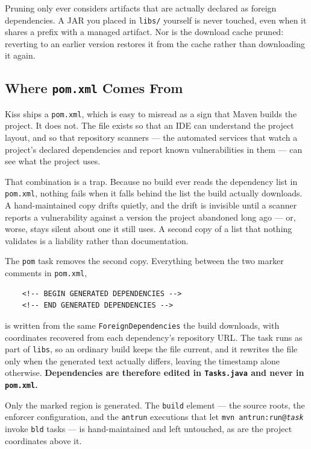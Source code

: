 \begin{notebox}
Pruning only ever considers artifacts that are actually declared as foreign dependencies.  A JAR you placed in \texttt{libs/} yourself is never touched, even when it shares a prefix with a managed artifact.  Nor is the download cache pruned: reverting to an earlier version restores it from the cache rather than downloading it again.
\end{notebox}

\subsection{Where \texttt{pom.xml} Comes From}
\label{sec:build-pom}

Kiss ships a \texttt{pom.xml}, which is easy to misread as a sign that Maven builds the project.  It does not.  The file exists so that an IDE can understand the project layout, and so that repository scanners --- the automated services that watch a project's declared dependencies and report known vulnerabilities in them --- can see what the project uses.

That combination is a trap.  Because no build ever reads the dependency list in \texttt{pom.xml}, nothing fails when it falls behind the list the build actually downloads.  A hand-maintained copy drifts quietly, and the drift is invisible until a scanner reports a vulnerability against a version the project abandoned long ago --- or, worse, stays silent about one it still uses.  A second copy of a list that nothing validates is a liability rather than documentation.

The \texttt{pom} task removes the second copy.  Everything between the two marker comments in \texttt{pom.xml},

\begin{verbatim}
    <!-- BEGIN GENERATED DEPENDENCIES -->
    <!-- END GENERATED DEPENDENCIES -->
\end{verbatim}

\noindent is written from the same \texttt{ForeignDependencies} the build downloads, with coordinates recovered from each dependency's repository URL.  The task runs as part of \texttt{libs}, so an ordinary build keeps the file current, and it rewrites the file only when the generated text actually differs, leaving the timestamp alone otherwise.  \textbf{Dependencies are therefore edited in \texttt{Tasks.java} and never in \texttt{pom.xml}.}

Only the marked region is generated.  The \texttt{build} element --- the source roots, the enforcer configuration, and the \texttt{antrun} executions that let \texttt{mvn antrun:run@\emph{task}} invoke \texttt{bld} tasks --- is hand-maintained and left untouched, as are the project coordinates above it.

